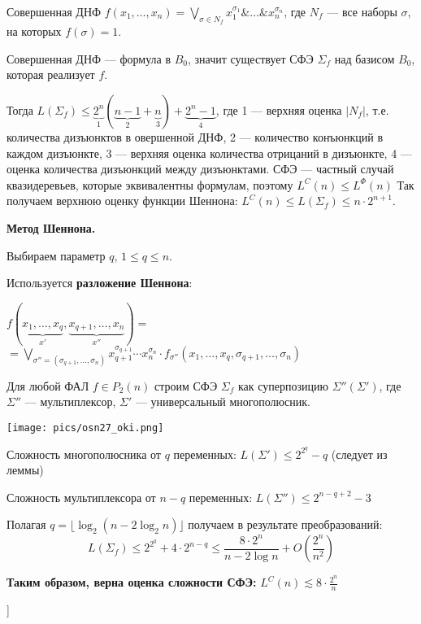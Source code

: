 Совершенная ДНФ $f(x_1,\dots,x_n) = \displaystyle\bigvee_{\sigma \in N_f} x_1^{\sigma_1} \&\dots\&x_n^{\sigma_n}$, где $N_f$ --- все наборы $\sigma$, на которых $f(\sigma) = 1$.

Совершенная ДНФ --- формула в $B_0$, значит существует СФЭ $\Sigma_f$ над базисом $B_0$, которая реализует $f$. 

Тогда 
$L(\Sigma_f) \leqslant \underbrace{2^n}_{1}(\underbrace{n - 1}_{2} + \underbrace{n}_{3} ) + \underbrace{2^n - 1}_{4}$,
где 1 --- верхняя оценка $|N_f |$, т.е. количества дизъюнктов в овершенной ДНФ, 2 --- количество конъюнкций в каждом дизъюнкте, 3 --- верхняя оценка количества отрицаний в дизъюнкте, 4 --- оценка количества дизъюнкций между дизъюнктами. СФЭ --- частный случай квазидеревьев, которые эквивалентны формулам, поэтому  $L^C(n) \leqslant L^{\Phi}(n)$
Так получаем верхнюю оценку функции Шеннона: $L^C(n) \leqslant L(\Sigma_f) \leqslant n \cdot 2^{n+1}$.

\bigbreak    
\textbf{Метод Шеннона.}
    
Выбираем параметр $q$, $1 \leqslant q \leqslant n$.

Используется \textbf{разложение Шеннона}:

$f(\underbrace{x_1,\dots,x_q}_{x'},\underbrace{x_{q+1},\dots,x_n}_{x''}) = $ \\
$= \displaystyle\bigvee_{\sigma''=(\sigma_{q+1},\dots,\sigma_n)} x_{q+1}^{\sigma_{q+1}}\cdots x_n^{\sigma_n}\cdot f_{\sigma''}(x_1,\dots,x_q,\sigma_{q+1},\dots,\sigma_n)$

Для любой ФАЛ $f \in P_2(n)$ строим СФЭ $\Sigma_f$ как суперпозицию $\Sigma''(\Sigma')$, где $\Sigma''$ --- мультиплексор, $\Sigma'$ --- универсальный многополюсник.

\texttt{[image: pics/osn27\_oki.png]}

Сложность многополюсника от $q$ переменных: $L(\Sigma') \leqslant 2^{2^q} - q $ (следует из леммы)

Сложность мультиплексора от $n-q$ переменных: $L(\Sigma'') \leqslant 2^{n - q + 2} - 3$

Полагая $q = \lfloor \log_2(n - 2\log_2 n) \rfloor$ получаем в результате преобразований: 
$$ L(\Sigma_f) \leqslant 2^{2^q} + 4\cdot 2^{n - q} \leqslant \frac{8 \cdot 2^n}{n - 2\log n} + O(\frac{2^n}{n^2}) $$

\textbf{Таким образом, верна оценка сложности СФЭ: }$L^C(n) \lesssim 8 \cdot \frac{2^n}{n}$

\bigbreak
[\cite[page 69-96]{replace_me}]